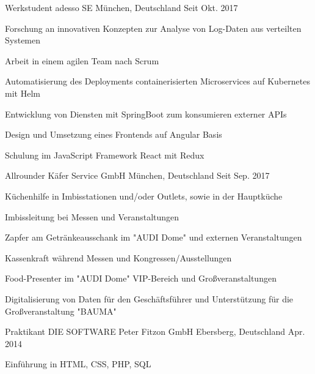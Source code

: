 \documentclass[11pt, a4paper]{awesome-cv}
\begin{document}
\begin{cventries}

  \cventry
  {Werkstudent} %
  {adesso SE} %
  {München, Deutschland} %
  {Seit Okt. 2017} %
  {
    \begin{cvitems} %
      \item {Forschung an innovativen Konzepten zur Analyse von Log-Daten aus verteilten Systemen}
      \item {Arbeit in einem agilen Team nach Scrum}
      \item {Automatisierung des Deployments containerisierten Microservices auf Kubernetes mit Helm}
      \item {Entwicklung von Diensten mit SpringBoot zum konsumieren externer APIs}
      \item {Design und Umsetzung eines Frontends auf Angular Basis}
      \item {Schulung im JavaScript Framework React mit Redux}
    \end{cvitems}
  }

  \cventry
  {Allrounder} %
  {Käfer Service GmbH} %
  {München, Deutschland} %
  {Seit Sep. 2017} %
  {
    \begin{cvitems} %
      \item {Küchenhilfe in Imbisstationen und/oder Outlets, sowie in der Hauptküche}
      \item {Imbissleitung bei Messen und Veranstaltungen}
      \item {Zapfer am Getränkeausschank im "AUDI Dome" und externen Veranstaltungen}
      \item {Kassenkraft während Messen und Kongressen/Ausstellungen}
      \item {Food-Presenter im "AUDI Dome" VIP-Bereich und Großveranstaltungen}
      \item {Digitalisierung von Daten für den Geschäftsführer und Unterstützung für die Großveranstaltung "BAUMA"}
    \end{cvitems}
  }

  \cventry
  {Praktikant} %
  {DIE SOFTWARE Peter Fitzon GmbH} %
  {Ebersberg, Deutschland} %
  {Apr. 2014} %
  {
    \begin{cvitems} %
      \item {Einführung in HTML, CSS, PHP, SQL}
    \end{cvitems}
  }

\end{cventries}
\end{document}
